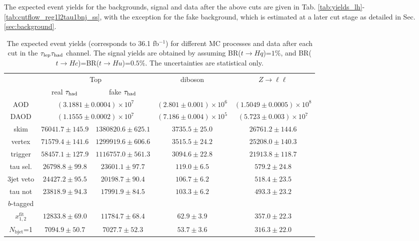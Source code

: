 The expected event yields for the backgrounds, signal and data after the above cuts are given in Tab. \ref{tab:yields_lh}-\ref{tab:cutflow_reg1l2tau1bnj_ss}, with the exception for the fake background, which is estimated at a later cut stage as detailed in Sec. \ref{sec:background}.

\begin{table}
\footnotesize
\caption{ The expected event yields (corresponds to 36.1 fb$^{-1}$) for different MC processes and data after each cut in the $\tau_\text{lep}{}\tau_\text{had}$ channel. The signal yields are obtained by assuming BR($t\to Hq$)=$1\%$, and BR($t\to Hc$)=BR($t\to Hu$)=$0.5\%$. The uncertainties are statistical only.}
\centering
\begin{tabular}{|c|c|c|c|c|} \hline
  & \multicolumn{2}{c|}{Top} & \multirow{2}{*}{diboson} & \multirow{2}{*}{$Z\to\ell\ell$} \\ \cline{2-3}
  & real $\tau_\text{had}$ & fake $\tau_\text{had}$ & & \\ \hline
     AOD & \multicolumn{2}{c|}{$(3.1881\pm 0.0004)\times10^7$} & $(2.801\pm 0.001)\times10^6$ & $(1.5049\pm0.0005)\times10^8$ \\ \hline
    DAOD & \multicolumn{2}{c|}{$(1.1555\pm 0.0002)\times10^7$} & $(7.186\pm 0.004)\times10^5$ & $(5.723\pm 0.003)\times10^7$ \\ \hline
skim & $ 76041.7 \pm 145.9$ & $ 1380820.6 \pm 625.1$ & $ 3735.5 \pm 25.0$ & $ 26761.2 \pm 144.6$ \\ \hline
vertex & $ 71579.4 \pm 141.6$ & $ 1299919.6 \pm 606.6$ & $ 3515.5 \pm 24.2$ & $ 25208.0 \pm 140.3$ \\ \hline
trigger & $ 58457.1 \pm 127.9$ & $ 1116757.0 \pm 561.3$ & $ 3094.6 \pm 22.8$ & $ 21913.8 \pm 118.7$ \\ \hline
tau sel. & $ 26798.8 \pm 99.8$ & $ 23601.1 \pm 97.7$ & $ 119.0 \pm 6.5$ & $ 579.2 \pm 24.8$ \\ \hline
3jet veto & $ 24427.2 \pm 95.5$ & $ 20198.7 \pm 90.4$ & $ 106.7 \pm 6.2$ & $ 518.4 \pm 23.5$ \\ \hline
tau not & \multirow{2}{*}{$ 23818.9 \pm 94.3$} & \multirow{2}{*}{$ 17991.9 \pm 84.5$} & \multirow{2}{*}{$ 103.3 \pm 6.2$} & \multirow{2}{*}{$ 493.3 \pm 23.2$} \\
 $b$-tagged & & & & \\ \hline
$x_{1,2}^{\text{fit}}$ & $ 12833.8 \pm 69.0$ & $ 11784.7 \pm 68.4$ & $ 62.9 \pm 3.9$ & $ 357.0 \pm 22.3$ \\ \hline
$N_{\text{bjet}}$=1 & $ 7094.9 \pm 50.7$ & $ 7027.7 \pm 52.3$ & $ 53.7 \pm 3.6$ & $ 316.3 \pm 22.0$ \\ \hline\hline

\end{tabular}
\end{table}
